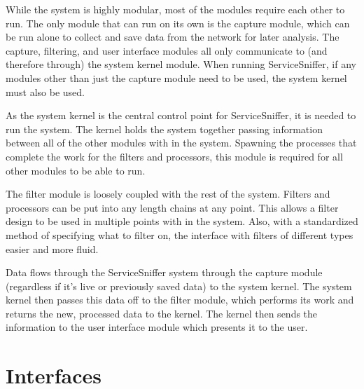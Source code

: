 \documentclass[titlepage]{article}
\begin{document}

While the system is highly modular, most of the modules require each other to
run.  The only module that can run on its own is the capture module, which can
be run alone to collect and save data from the network for later analysis.  The
capture, filtering, and user interface modules all only communicate to (and
therefore through) the system kernel module.  When running ServiceSniffer, if
any modules other than just the capture module need to be used, the system
kernel must also be used.  

As the system kernel is the central control point for ServiceSniffer, it is
needed to run the system. The kernel holds the system together passing
information between all of the other modules with in the system. Spawning the
processes that complete the work for the filters and processors, this module
is required for all other modules to be able to run.

The filter module is loosely coupled with the rest of the system. Filters and
processors can be put into any length chains at any point. This allows a filter
design to be used in multiple points with in the system. Also, with a
standardized method of specifying what to filter on, the interface with filters
of different types easier and more fluid.

Data flows through the ServiceSniffer system through the capture module
(regardless if it's live or previously saved data) to the system kernel.  The
system kernel then passes this data off to the filter module, which performs
its work and returns the new, processed data to the kernel.  The kernel then
sends the information to the user interface module which presents it to the
user.


\clearpage

\section{Interfaces
    \label{interfaces}
}
%

\end{document}
